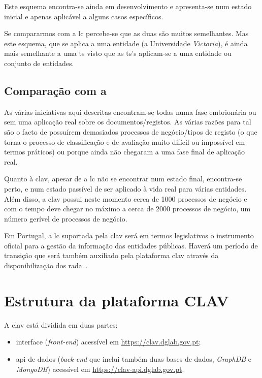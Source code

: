 Este esquema encontra-se ainda em desenvolvimento e apresenta-se num estado inicial e apenas aplicável a alguns 
casos específicos.

Se compararmos com a \acrshort{lc} percebe-se que as duas são muitos semelhantes. 
Mas este esquema, que se aplica a uma entidade (a Universidade \textit{Victoria}), é ainda mais semelhante a 
uma \acrshort{ts} visto que as \acrshort{ts}'s aplicam-se a uma entidade ou conjunto de entidades.

\subsection{Comparação com a }

As várias iniciativas aqui descritas encontram-se todas numa fase embrionária ou sem uma aplicação real sobre os 
documentos/registos. As várias razões para tal são o facto de possuírem demasiados processos de negócio/tipos de 
registo (o que torna o processo de classificação e de avaliação muito difícil ou impossível em termos práticos) 
ou porque ainda não chegaram a uma fase final de aplicação real.

Quanto à \acrshort{clav}, apesar de a \acrshort{lc} não se encontrar num estado final, encontra-se perto, e num 
estado passível de ser aplicado à vida real para várias entidades. Além disso, a \acrshort{clav} possui neste 
momento cerca de 1000 processos de negócio e com o tempo deve chegar no máximo a cerca de 2000 processos de negócio, 
um número gerível de processos de negócio.

Em Portugal, a \acrshort{lc} suportada pela \acrshort{clav} será em termos legislativos o instrumento oficial 
para a gestão da informação das entidades públicas. Haverá um período de transição que será também auxiliado pela 
plataforma \acrshort{clav} através da disponibilização dos \acrshort{rada}~\cite{rada}.

\section{Estrutura da plataforma CLAV}
A \acrshort{clav} está dividida em duas partes:
\begin{itemize}
    \item interface (\textit{front-end}) acessível em \url{https://clav.dglab.gov.pt};
    \item \acrshort{api} de dados (\textit{back-end} que inclui também duas bases de dados, \textit{GraphDB} e 
    \textit{MongoDB}) acessível em \url{https://clav-api.dglab.gov.pt}.
\end{itemize}

